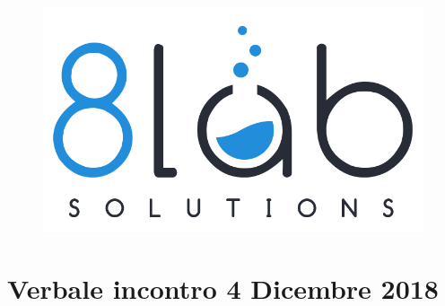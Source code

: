 \documentclass[a4paper]{article}
\begin{document}
\begin{figure}
\centering
\includegraphics[scale=0.07]{images/logo8_crop.png}
\end{figure}

\section*{Verbale incontro 4 Dicembre 2018}
\end{document}
